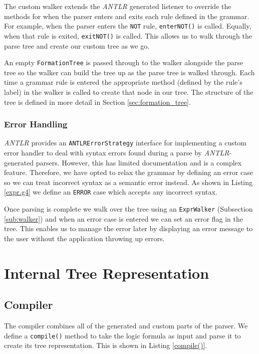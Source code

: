 \documentclass{report}
\begin{document}
The custom walker extends the \emph{ANTLR} generated listener to override the methods for when the parser enters and exits each rule defined in the grammar. For example, when the parser enters the {\tt NOT} rule, {\tt enterNOT()} is called. Equally, when that rule is exited, {\tt exitNOT()} is called. This allows us to walk through the parse tree and create our custom tree as we go.

An empty {\tt FormationTree} is passed through to the walker alongside the parse tree so the walker can build the tree up as the parse tree is walked through. Each time a grammar rule is entered the appropriate method (defined by the rule's label) in the walker is called to create that node in our tree. The structure of the tree is defined in more detail in Section \ref{sec:formation_tree}.

\subsection{Error Handling}
\label{sub:error_handling}

\emph{ANTLR} provides an {\tt ANTLRErrorStrategy} interface for implementing a custom error handler to deal with syntax errors found during a parse by \emph{ANTLR}-generated parsers. However, this has limited documentation and is a complex feature. Therefore, we have opted to relax the grammar by defining an error case so we can treat incorrect syntax as a semantic error instead. As shown in Listing \ref{expr.g4} we define an {\tt ERROR} case which accepts any incorrect syntax. 

Once parsing is complete we walk over the tree using an {\tt ExprWalker} (Subsection \ref{sub:walker}) and when an error case is entered we can set an error flag in the tree. This enables us to manage the error later by displaying an error message to the user without the application throwing up errors.

\chapter{Internal Tree Representation}
\label{chap:internal_tree_representation}

\section{Compiler}
\label{sec:compiler}

The compiler combines all of the generated and custom parts of the parser. We define a {\tt compile()} method to take the logic formula as input and parse it to create its tree representation. This is shown in Listing \ref{compile()}.
\end{document}

